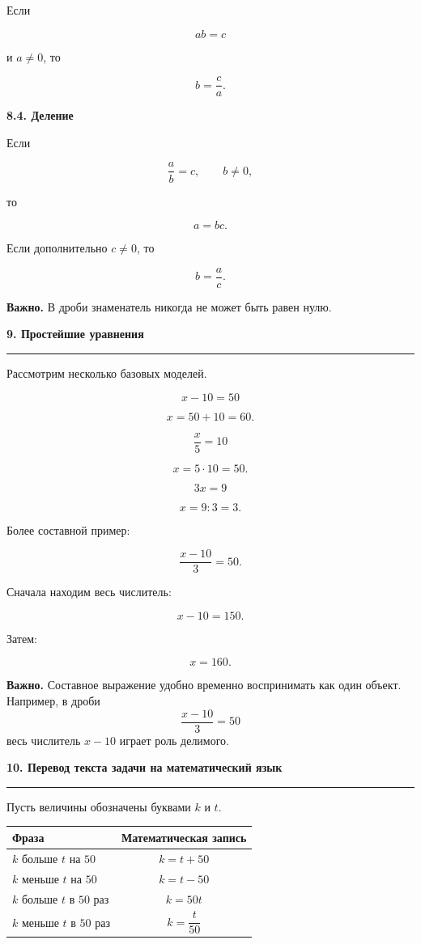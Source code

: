 \documentclass[a4paper,12pt]{article}
\newcommand{\topic}[1]{%
  \vspace{0.7em}
  {\Large\bfseries\color{darkaccent}#1}\par
  \vspace{0.25em}
  {\color{accent}\rule{\linewidth}{0.5pt}}
  \vspace{0.55em}
}
\newcommand{\subtopic}[1]{%
  \vspace{0.4em}
  {\large\bfseries\color{darkaccent}#1}\par
  \vspace{0.15em}
}
\newcommand{\important}[1]{%
  \par
  \vspace{0.25em}
  \noindent
  \textcolor{darkaccent}{\textbf{Важно.}} #1
  \par
}
\begin{document}
Если

\[
ab=c
\]

и $a\ne0$, то

\[
b=\frac ca.
\]

\subtopic{8.4. Деление}

Если

\[
\frac ab=c,
\qquad b\ne0,
\]

то

\[
a=bc.
\]

Если дополнительно $c\ne0$, то

\[
b=\frac ac.
\]

\important{
В дроби знаменатель никогда не может быть равен нулю.
}

\topic{9. Простейшие уравнения}

Рассмотрим несколько базовых моделей.

\[
x-10=50
\]

\[
x=50+10=60.
\]

\vspace{0.4em}

\[
\frac{x}{5}=10
\]

\[
x=5\cdot10=50.
\]

\vspace{0.4em}

\[
3x=9
\]

\[
x=9:3=3.
\]

\vspace{0.4em}

Более составной пример:

\[
\frac{x-10}{3}=50.
\]

Сначала находим весь числитель:

\[
x-10=150.
\]

Затем:

\[
x=160.
\]

\important{
Составное выражение удобно временно воспринимать как один объект.
Например, в дроби
\[
\frac{x-10}{3}=50
\]
весь числитель $x-10$ играет роль делимого.
}

\topic{10. Перевод текста задачи на математический язык}

Пусть величины обозначены буквами $k$ и $t$.

\begin{center}
\renewcommand{\arraystretch}{1.4}
\begin{tabularx}{0.9\linewidth}{@{}Xc@{}}
\toprule
\textbf{Фраза} & \textbf{Математическая запись}\\
\midrule
$k$ больше $t$ на $50$ & $k=t+50$\\
$k$ меньше $t$ на $50$ & $k=t-50$\\
$k$ больше $t$ в $50$ раз & $k=50t$\\
$k$ меньше $t$ в $50$ раз & $k=\dfrac{t}{50}$\\
\bottomrule
\end{tabularx}
\end{center}
\end{document}
